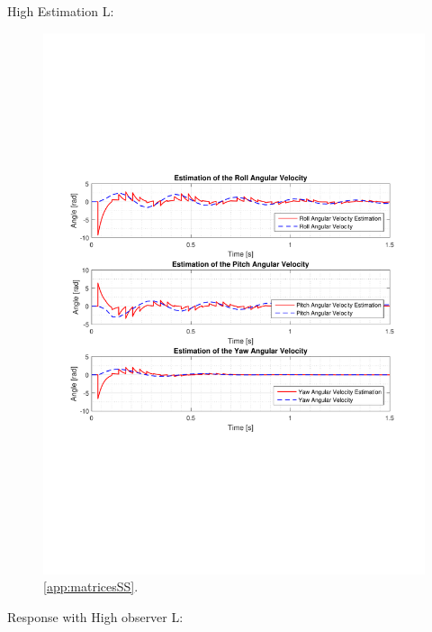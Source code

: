 High Estimation L:

\begin{figure}[H]
	\centering
	\includegraphics[scale=0.8]{figures/ssObsHigh.pdf}
	\caption{\autoref{app:matricesSS}.}
	\label{fig:TranslationalControlDiagram}
\end{figure}

Response with High observer L:

